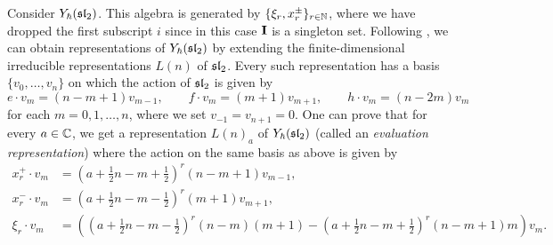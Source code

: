 \begin{example}\label{E:Y(sl2)}
    Consider $Y_\hbar(\mathfrak{sl}_2)$.
    This algebra is generated by $\{\xi_r,x^\pm_r\}_{r\in\mathbb{N}}$, where we have dropped the first subscript $i$ since in this case $\mathbf{I}$ is a singleton set.
    Following \cite[\S 12.1]{chari_guide_1995}, we can obtain representations of $Y_\hbar(\mathfrak{sl}_2)$ by extending the finite-dimensional irreducible representations $L(n)$ of $\mathfrak{sl}_2$.
    Every such representation has a basis $\{v_0,\dots,v_n\}$ on which the action of $\mathfrak{sl}_2$ is given by
    \[e\cdot v_m = (n-m+1)v_{m-1}, \qquad f\cdot v_m = (m+1)v_{m+1}, \qquad h\cdot v_m = (n-2m)v_m\]
    for each $m=0,1,\dots,n$, where we set $v_{-1}=v_{n+1}=0$.
    One can prove that for every $a\in\mathbb{C}$, we get a representation $L(n)_a$ of $Y_\hbar(\mathfrak{sl}_2)$ (called an \emph{evaluation representation}) where the action on the same basis as above is given by
    \begin{align*}
        x^+_r\cdot v_m &= \left(a+\frac{1}{2}n-m+\frac{1}{2}\right)^r(n-m+1)v_{m-1}, \\
        x^-_r\cdot v_m &= \left(a+\frac{1}{2}n-m-\frac{1}{2}\right)^r(m+1)v_{m+1}, \\
        \xi_r\cdot v_m &= \left(\left(a+\frac{1}{2}n-m-\frac{1}{2}\right)^r(n-m)(m+1) -\left(a+\frac{1}{2}n-m+\frac{1}{2}\right)^r(n-m+1)m\right) v_m.
    \end{align*}


\end{example}
